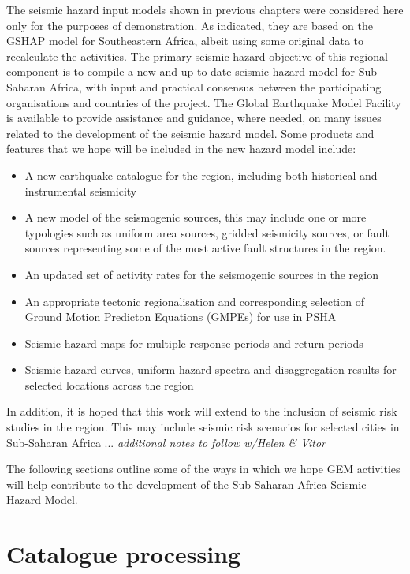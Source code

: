 The seismic hazard input models shown in previous chapters were considered here only for the purposes of demonstration. As indicated, they are based on the GSHAP model for Southeastern Africa, albeit using some original data to recalculate the activities. The primary seismic hazard objective of this regional component is to compile a new and up-to-date seismic hazard model for Sub-Saharan Africa, with input and practical consensus between the participating organisations and countries of the project. The Global Earthquake Model Facility is available to provide assistance and guidance, where needed, on many issues related to the development of the seismic hazard model. Some products and features that we hope will be included in the new hazard model include:
\begin{itemize}
\item A new earthquake catalogue for the region, including both historical and instrumental seismicity
\item A new model of the seismogenic sources, this may include one or more typologies such as uniform area sources, gridded seismicity sources, or fault sources representing some of the most active fault structures in the region. 
\item An updated set of activity rates for the seismogenic sources in the region
\item An appropriate tectonic regionalisation and corresponding selection of Ground Motion Predicton Equations (GMPEs) for use in PSHA
\item Seismic hazard maps for multiple response periods and return periods
\item Seismic hazard curves, uniform hazard spectra and disaggregation results for selected locations across the region
\end{itemize}

In addition, it is hoped that this work will extend to the inclusion of seismic risk studies in the region. This may include seismic risk scenarios for selected cities in Sub-Saharan Africa ... \emph{additional notes to follow w/Helen \& Vitor}

The following sections outline some of the ways in which we hope GEM activities will help contribute to the development of the Sub-Saharan Africa Seismic Hazard Model. 

\section{Catalogue processing}

